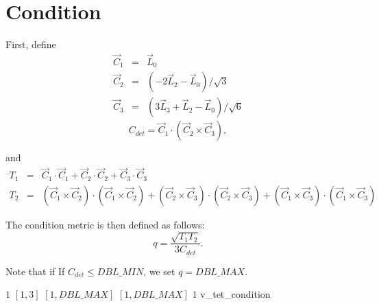 \section{Condition}

First, define
\[
\begin{array}{lcl}
\vec C_1 &=& \vec L_0 \\
\vec C_2 &=& \left(-2 \vec L_2 - \vec L_0\right)/\sqrt{3} \\
\vec C_3 &=& \left(3 \vec L_3 + \vec L_2 - \vec L_0\right)/\sqrt{6}
\end{array}
\]
\[
C_{det} = \vec C_1 \cdot ( \vec C_2 \times \vec C_3 ),
\]

and
\[
\begin{array}{lcl}
T_1 &=& \vec C_1 \cdot \vec C_1 + \vec C_2 \cdot \vec C_2 + \vec C_3 \cdot \vec C_3\\
T_2 &=& (\vec C_1 \times \vec C_2 ) \cdot (\vec C_1 \times \vec C_2) + 
      (\vec C_2 \times \vec C_3 ) \cdot (\vec C_2 \times \vec C_3) + 
      (\vec C_1 \times \vec C_3 ) \cdot (\vec C_1 \times \vec C_3)
\end{array}
\]

The condition metric is then defined as follows:
\begin{equation*}
q = \frac{ \sqrt{ T_1 T_2 } } { 3 C_{det} }.
\end{equation*}

Note that if If $C_{det} \leq DBL\_MIN$, we set $q = DBL\_MAX$.

%
{$1$}%
{$[1,3]$}%
{$[1,DBL\_MAX]$}%
{$[1,DBL\_MAX]$}%
{$1$}%
{\cite{knu:00}}%
{v\_tet\_condition}%


